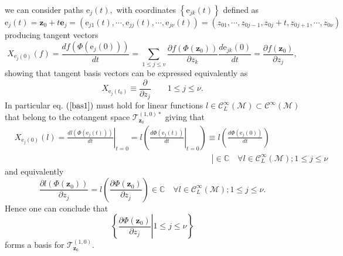 \documentclass[aps,preprint]{revtex4}%
\begin{document}
we can consider paths $\mathrm{e}_{j}\left(  t\right)  ,$ with coordinates
$\left\{  \mathrm{e}_{jk}\left(  t\right)  \right\}  $ defined as
\begin{equation}
\mathrm{e}_{j}\left(  t\right)  =\mathbf{z}_{0}+t\mathbf{e}_{j}=\left(
\mathrm{e}_{j1}\left(  t\right)  ,\cdots,\mathrm{e}_{jj}\left(  t\right)
,\cdots,\mathrm{e}_{j\nu}\left(  t\right)  \right)  =\left(  z_{01}%
,\cdots,z_{0j-1},z_{0j}+t,z_{0j+1},\cdots,z_{0\nu}\right)
\end{equation}
producing tangent vectors%
\begin{equation}
X_{\mathrm{e}_{j}\left(  0\right)  }\left(  f\right)  =\frac{df\left(
\Phi\left(  \mathrm{e}_{j}\left(  0\right)  \right)  \right)  }{dt}%
=\sum_{1\leq j\leq v}\frac{\partial f\left(  \Phi\left(  \mathbf{z}%
_{0}\right)  \right)  }{\partial z_{k}}\frac{d\mathrm{e}_{jk}\left(  0\right)
}{dt}=\frac{\partial f\left(  \mathbf{z}_{0}\right)  }{\partial z_{j}},
\label{bas1}%
\end{equation}
showing that tangent basis vectors can be expressed equivalently as%
\begin{equation}
X_{\mathrm{e}_{j}\left(  t_{0}\right)  }\equiv\frac{\partial}{\partial z_{j}%
}\qquad1\leq j\leq\nu.
\end{equation}
In particular eq. $\left(  \ref{bas1}\right)  $ must hold for linear functions
$l\in\mathcal{C}_{L}^{\infty}\left(  \mathcal{M}\right)  \subset
\mathcal{C}^{\infty}\left(  \mathcal{M}\right)  $ that belong to the cotangent
space $\mathcal{T}_{\mathbf{z}_{0}}^{\left(  1,0\right)  \ast}$ giving that
\begin{align}
&  X_{\mathrm{e}_{j}\left(  0\right)  }\left(  l\right)  =\left.
\frac{dl\left(  \Phi\left(  \mathrm{e}_{j}\left(  t\right)  \right)  \right)
}{dt}\right\vert _{t=0}=l\left(  \left.  \frac{d\Phi\left(  \mathrm{e}%
_{j}\left(  t\right)  \right)  }{dt}\right\vert _{t=0}\right)  \equiv l\left(
\frac{d\Phi\left(  \mathrm{e}_{j}\left(  0\right)  \right)  }{dt}\right)
\nonumber\\
&  \left.  \qquad\qquad\qquad\qquad\qquad\qquad\qquad\qquad\qquad\qquad
\qquad\qquad\right\vert \in\mathbb{C\quad\forall}l\in\mathcal{C}_{L}^{\infty
}\left(  \mathcal{M}\right)  ;1\leq j\leq\nu
\end{align}
and equivalently
\begin{equation}
\frac{\partial l\left(  \Phi\left(  \mathbf{z}_{0}\right)  \right)  }{\partial
z_{j}}=l\left(  \frac{\partial\Phi\left(  \mathbf{z}_{0}\right)  }{\partial
z_{j}}\right)  \in\mathbb{C\quad\forall}l\in\mathcal{C}_{L}^{\infty}\left(
\mathcal{M}\right)  ;1\leq j\leq\nu.
\end{equation}
Hence one can conclude that
\begin{equation}
\left\{  \left.  \frac{\partial\Phi\left(  \mathbf{z}_{0}\right)  }{\partial
z_{j}}\right\vert 1\leq j\leq\nu\right\}  \label{tanbas}%
\end{equation}
forms a basis for $\mathcal{T}_{\mathbf{z}_{0}}^{\left(  1,0\right)  }.$
\end{document}
